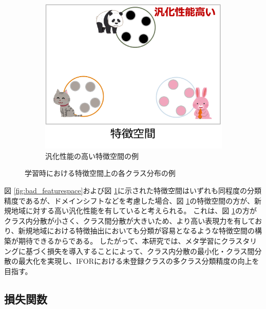 \documentclass[a4paper,11pt,nomag]{jsreport}
\begin{document}
\begin{figure}[tbp]
\begin{subfigure}[b]{0.45\linewidth}
    \includegraphics[height=0.9\linewidth, keepaspectratio]{image/good_featurespace.png}
    \caption{汎化性能の高い特徴空間の例}
    \label{fig:good_featurespace}
  \end{subfigure}
  \caption{学習時における特徴空間上の各クラス分布の例}
  \label{fig:feature_space}
\end{figure}
% 
図 \ref{fig:bad_featurespace}および図 \ref{fig:good_featurespace}に示された特徴空間はいずれも同程度の分類精度であるが、ドメインシフトなどを考慮した場合、図 \ref{fig:good_featurespace}の特徴空間の方が、新規地域に対する高い汎化性能を有していると考えられる。
これは、図 \ref{fig:good_featurespace}の方がクラス内分散が小さく、クラス間分散が大きいため、より高い表現力を有しており、新規地域における特徴抽出においても分類が容易となるような特徴空間の構築が期待できるからである。
したがって、本研究では、メタ学習にクラスタリングに基づく損失を導入することによって、クラス内分散の最小化・クラス間分散の最大化を実現し、IFORにおける未登録クラスの多クラス分類精度の向上を目指す。

\subsection{損失関数}
\end{document}
